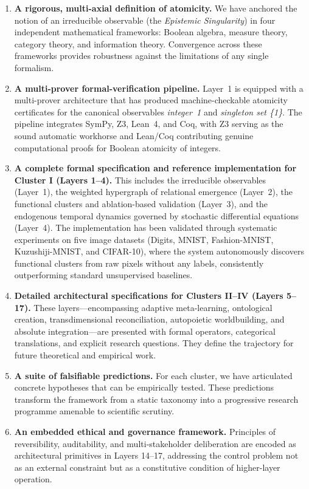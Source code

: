 \begin{enumerate}
    \item \textbf{A rigorous, multi-axial definition of atomicity.} We have anchored the notion of an irreducible observable (the \emph{Epistemic Singularity}) in four independent mathematical frameworks: Boolean algebra, measure theory, category theory, and information theory. Convergence across these frameworks provides robustness against the limitations of any single formalism.
    
    \item \textbf{A multi-prover formal-verification pipeline.} Layer~1 is equipped with a multi-prover architecture that has produced machine-checkable atomicity certificates for the canonical observables \emph{integer~1} and \emph{singleton set \{1\}}. The pipeline integrates SymPy, Z3, Lean~4, and Coq, with Z3 serving as the sound automatic workhorse and Lean/Coq contributing genuine computational proofs for Boolean atomicity of integers.
    
    \item \textbf{A complete formal specification and reference implementation for Cluster I (Layers 1--4).} This includes the irreducible observables (Layer~1), the weighted hypergraph of relational emergence (Layer~2), the functional clusters and ablation-based validation (Layer~3), and the endogenous temporal dynamics governed by stochastic differential equations (Layer~4). The implementation has been validated through systematic experiments on five image datasets (Digits, MNIST, Fashion-MNIST, Kuzushiji-MNIST, and CIFAR-10), where the system autonomously discovers functional clusters from raw pixels without any labels, consistently outperforming standard unsupervised baselines.
    
    \item \textbf{Detailed architectural specifications for Clusters II--IV (Layers 5--17).} These layers---encompassing adaptive meta-learning, ontological creation, transdimensional reconciliation, autopoietic worldbuilding, and absolute integration---are presented with formal operators, categorical translations, and explicit research questions. They define the trajectory for future theoretical and empirical work.
    
    \item \textbf{A suite of falsifiable predictions.} For each cluster, we have articulated concrete hypotheses that can be empirically tested. These predictions transform the framework from a static taxonomy into a progressive research programme amenable to scientific scrutiny.
    
    \item \textbf{An embedded ethical and governance framework.} Principles of reversibility, auditability, and multi-stakeholder deliberation are encoded as architectural primitives in Layers 14--17, addressing the control problem not as an external constraint but as a constitutive condition of higher-layer operation.
\end{enumerate}

